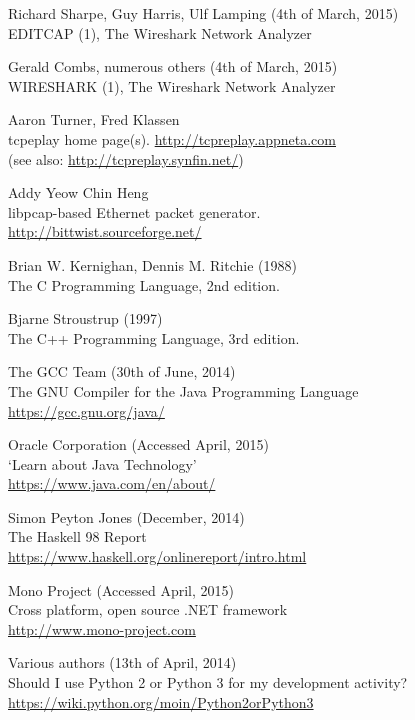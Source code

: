 \documentclass[10pt,a4paper,notitlepage]{report}
\begin{document}
\begin{thebibliography}{99}
    Richard Sharpe, Guy Harris, Ulf Lamping (4th of March, 2015)\\
    EDITCAP (1), The Wireshark Network Analyzer

    Gerald Combs, numerous others (4th of March, 2015)\\
    WIRESHARK (1), The Wireshark Network Analyzer

    Aaron Turner, Fred Klassen\\
    tcpeplay home page(s).
    \url{http://tcpreplay.appneta.com}\\
    (see also: \url{http://tcpreplay.synfin.net/})

    Addy Yeow Chin Heng\\
    libpcap-based Ethernet packet generator.\\
    \url{http://bittwist.sourceforge.net/}

	Brian W. Kernighan, Dennis M. Ritchie (1988)\\
	The C Programming Language, 2nd edition.

	Bjarne Stroustrup (1997)\\
	The C++ Programming Language, 3rd edition.

	The GCC Team (30th of June, 2014)\\
	The GNU Compiler for the Java Programming Language\\
	\url{https://gcc.gnu.org/java/}

	Oracle Corporation (Accessed April, 2015)\\
	`Learn about Java Technology'\\
	\url{https://www.java.com/en/about/}

    Simon Peyton Jones (December, 2014)\\
    The Haskell 98 Report\\
    \url{https://www.haskell.org/onlinereport/intro.html}

	Mono Project (Accessed April, 2015)\\
	Cross platform, open source .NET framework\\
	\url{http://www.mono-project.com}

    Various authors (13th of April, 2014)\\
    Should I use Python 2 or Python 3 for my development activity?\\
    \url{https://wiki.python.org/moin/Python2orPython3}


\end{thebibliography}
\end{document}
